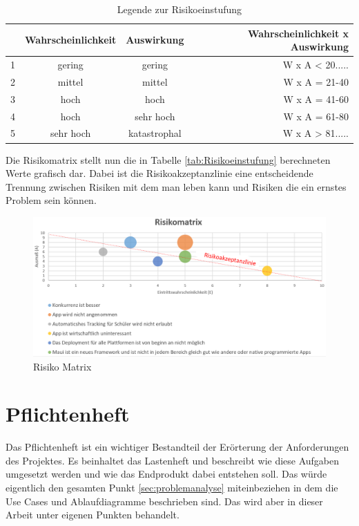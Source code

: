 \begin{table}[H]
	\centering
	\begin{tabular}{|c|c|c|r|}
		\hline
		\textbf {} & \textbf{Wahrscheinlichkeit} & \textbf{Auswirkung} & \textbf{Wahrscheinlichkeit x Auswirkung} \\
		\hline
		1 & gering 		& gering 		& W x A \quad < 20.....\\
		\hline
		2 & mittel 		& mittel 		& W x A \quad = 21-40\\
		\hline
		3 & hoch   		& hoch 			& W x A \quad = 41-60\\
		\hline
		4 & hoch 	& sehr hoch			& W x A \quad = 61-80\\
		\hline
		5 & sehr hoch 	& katastrophal		& W x A \quad  > 81.....\\
		\hline
	\end{tabular}
	\caption{Legende zur Risikoeinstufung}
	\label{tab:Legende}
\end{table}

\newpage
Die Risikomatrix stellt nun die in Tabelle \ref{tab:Risikoeinstufung} berechneten Werte grafisch dar. Dabei ist die Risikoakzeptanzlinie eine entscheidende Trennung zwischen Risiken mit dem man leben kann und Risiken die ein ernstes Problem sein können.
\begin{figure}[H]
	\centering
	\includegraphics[width=15cm]{figures/Risikomatrix.png} %
	\caption{Risiko Matrix}
	\label{fig:Risikomatrix}
\end{figure}

\newpage
\section{Pflichtenheft}

Das Pflichtenheft ist ein wichtiger Bestandteil der Erörterung der Anforderungen des Projektes. Es beinhaltet das Lastenheft und beschreibt wie diese Aufgaben umgesetzt werden und wie das Endprodukt dabei entstehen soll. Das würde eigentlich den gesamten Punkt \ref{sec:problemanalyse} miteinbeziehen in dem die Use Cases und Ablaufdiagramme beschrieben sind. Das wird aber in dieser Arbeit unter eigenen Punkten behandelt.

